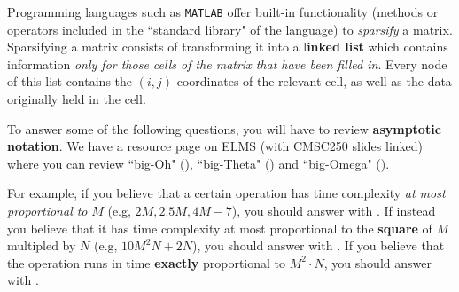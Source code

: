 \documentclass[letterpaper,12pt]{article}
\begin{document}
Programming languages such as {\tt MATLAB} offer built-in functionality (methods or operators included in the ``standard library" of the language) to {\em sparsify} a matrix. Sparsifying a matrix consists of transforming it into a l\textbf{inked list} which contains information {\em only for those cells of the matrix that have been filled in}. Every node of this list contains the $(i, j)$ coordinates of the relevant cell, as well as the data originally held in the cell. 

To answer some of the following questions, you will have to review {\bf asymptotic notation}. We have a resource page on ELMS (with CMSC250 slides linked) where you can review ``big-Oh" (\bigoh{$\cdot$}), ``big-Theta" (\bigtheta{$\cdot$}) and ``big-Omega" (\bigomega{$\cdot$}). 

For example, if you believe that a certain operation has time complexity {\em at most proportional to} $M$ (e.g, $2M, 2.5M, 4M - 7$), you should answer with . If instead you believe that it has time complexity at most proportional to the \textbf{square} of $M$ multipled by $N$ (e.g, $10 M ^2N + 2N$), you should answer with . If you believe that the operation runs in time {\bf exactly} proportional to $M^2 \cdot N$, you should answer with .

\vspace{1in} 

\pagebreak
\end{document}
